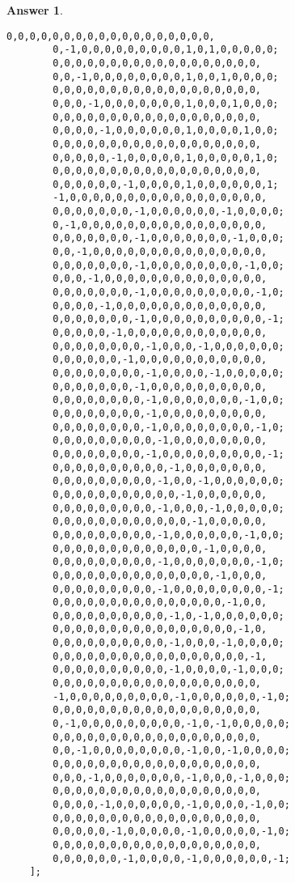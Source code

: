 \documentclass[12pt]{article}
\theoremstyle{colon}
\newtheorem*{answer}{Answer}
\begin{document}
\begin{answer}
\begin{lstlisting}[style=Matlab-editor, basicstyle=\scriptsize]
        0,0,0,0,0,0,0,0,0,0,0,0,0,0,0,0,0,0,
        0,-1,0,0,0,0,0,0,0,0,0,1,0,1,0,0,0,0,0;
        0,0,0,0,0,0,0,0,0,0,0,0,0,0,0,0,0,0,
        0,0,-1,0,0,0,0,0,0,0,0,1,0,0,1,0,0,0,0;
        0,0,0,0,0,0,0,0,0,0,0,0,0,0,0,0,0,0,
        0,0,0,-1,0,0,0,0,0,0,0,1,0,0,0,1,0,0,0;
        0,0,0,0,0,0,0,0,0,0,0,0,0,0,0,0,0,0,
        0,0,0,0,-1,0,0,0,0,0,0,1,0,0,0,0,1,0,0;
        0,0,0,0,0,0,0,0,0,0,0,0,0,0,0,0,0,0,
        0,0,0,0,0,-1,0,0,0,0,0,1,0,0,0,0,0,1,0;
        0,0,0,0,0,0,0,0,0,0,0,0,0,0,0,0,0,0,
        0,0,0,0,0,0,-1,0,0,0,0,1,0,0,0,0,0,0,1;
        -1,0,0,0,0,0,0,0,0,0,0,0,0,0,0,0,0,0,
        0,0,0,0,0,0,0,-1,0,0,0,0,0,0,-1,0,0,0,0;
        0,-1,0,0,0,0,0,0,0,0,0,0,0,0,0,0,0,0,
        0,0,0,0,0,0,0,-1,0,0,0,0,0,0,0,-1,0,0,0;
        0,0,-1,0,0,0,0,0,0,0,0,0,0,0,0,0,0,0,
        0,0,0,0,0,0,0,-1,0,0,0,0,0,0,0,0,-1,0,0;
        0,0,0,-1,0,0,0,0,0,0,0,0,0,0,0,0,0,0,
        0,0,0,0,0,0,0,-1,0,0,0,0,0,0,0,0,0,-1,0;
        0,0,0,0,-1,0,0,0,0,0,0,0,0,0,0,0,0,0,
        0,0,0,0,0,0,0,-1,0,0,0,0,0,0,0,0,0,0,-1;
        0,0,0,0,0,-1,0,0,0,0,0,0,0,0,0,0,0,0,
        0,0,0,0,0,0,0,0,-1,0,0,0,-1,0,0,0,0,0,0;
        0,0,0,0,0,0,-1,0,0,0,0,0,0,0,0,0,0,0,
        0,0,0,0,0,0,0,0,-1,0,0,0,0,-1,0,0,0,0,0;
        0,0,0,0,0,0,0,-1,0,0,0,0,0,0,0,0,0,0,
        0,0,0,0,0,0,0,0,-1,0,0,0,0,0,0,0,-1,0,0;
        0,0,0,0,0,0,0,0,-1,0,0,0,0,0,0,0,0,0,
        0,0,0,0,0,0,0,0,-1,0,0,0,0,0,0,0,0,-1,0;
        0,0,0,0,0,0,0,0,0,-1,0,0,0,0,0,0,0,0,
        0,0,0,0,0,0,0,0,-1,0,0,0,0,0,0,0,0,0,-1;
        0,0,0,0,0,0,0,0,0,0,-1,0,0,0,0,0,0,0,
        0,0,0,0,0,0,0,0,0,-1,0,0,-1,0,0,0,0,0,0;
        0,0,0,0,0,0,0,0,0,0,0,-1,0,0,0,0,0,0,
        0,0,0,0,0,0,0,0,0,-1,0,0,0,-1,0,0,0,0,0;
        0,0,0,0,0,0,0,0,0,0,0,0,-1,0,0,0,0,0,
        0,0,0,0,0,0,0,0,0,-1,0,0,0,0,0,0,-1,0,0;
        0,0,0,0,0,0,0,0,0,0,0,0,0,-1,0,0,0,0,
        0,0,0,0,0,0,0,0,0,-1,0,0,0,0,0,0,0,-1,0;
        0,0,0,0,0,0,0,0,0,0,0,0,0,0,-1,0,0,0,
        0,0,0,0,0,0,0,0,0,-1,0,0,0,0,0,0,0,0,-1;
        0,0,0,0,0,0,0,0,0,0,0,0,0,0,0,-1,0,0,
        0,0,0,0,0,0,0,0,0,0,-1,0,-1,0,0,0,0,0,0;
        0,0,0,0,0,0,0,0,0,0,0,0,0,0,0,0,-1,0,
        0,0,0,0,0,0,0,0,0,0,-1,0,0,0,-1,0,0,0,0;
        0,0,0,0,0,0,0,0,0,0,0,0,0,0,0,0,0,-1,
        0,0,0,0,0,0,0,0,0,0,-1,0,0,0,0,-1,0,0,0;
        0,0,0,0,0,0,0,0,0,0,0,0,0,0,0,0,0,0,
        -1,0,0,0,0,0,0,0,0,0,-1,0,0,0,0,0,0,-1,0;
        0,0,0,0,0,0,0,0,0,0,0,0,0,0,0,0,0,0,
        0,-1,0,0,0,0,0,0,0,0,0,-1,0,-1,0,0,0,0,0;
        0,0,0,0,0,0,0,0,0,0,0,0,0,0,0,0,0,0,
        0,0,-1,0,0,0,0,0,0,0,0,-1,0,0,-1,0,0,0,0;
        0,0,0,0,0,0,0,0,0,0,0,0,0,0,0,0,0,0,
        0,0,0,-1,0,0,0,0,0,0,0,-1,0,0,0,-1,0,0,0;
        0,0,0,0,0,0,0,0,0,0,0,0,0,0,0,0,0,0,
        0,0,0,0,-1,0,0,0,0,0,0,-1,0,0,0,0,-1,0,0;
        0,0,0,0,0,0,0,0,0,0,0,0,0,0,0,0,0,0,
        0,0,0,0,0,-1,0,0,0,0,0,-1,0,0,0,0,0,-1,0;
        0,0,0,0,0,0,0,0,0,0,0,0,0,0,0,0,0,0,
        0,0,0,0,0,0,-1,0,0,0,0,-1,0,0,0,0,0,0,-1;
    ];


\end{lstlisting}
\end{answer}
\end{document}
